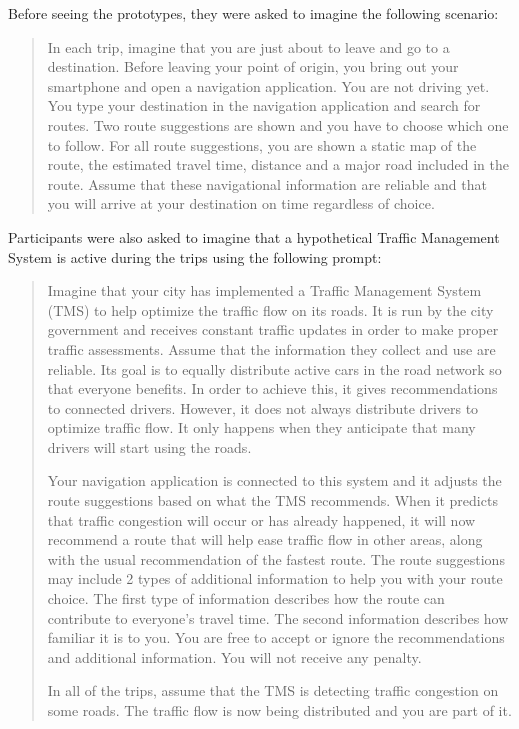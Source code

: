 Before seeing the prototypes, they were asked to imagine the following scenario:
\begin{quote}
    In each trip, imagine that you are just about to leave and go to a destination. Before leaving your point of origin, you bring out your smartphone and open a navigation application. You are not driving yet. You type your destination in the navigation application and search for routes. Two route suggestions are shown and you have to choose which one to follow. For all route suggestions, you are shown a static map of the route, the estimated travel time, distance and a major road included in the route. Assume that these navigational information are reliable and that you will arrive at your destination on time regardless of choice. 
\end{quote}

Participants were also asked to imagine that a hypothetical Traffic Management System is active during the trips using the following prompt:
\begin{quote}
    Imagine that your city has implemented a Traffic Management System (TMS) to help optimize the traffic flow on its roads. It is run by the city government and receives constant traffic updates in order to make proper traffic assessments. Assume that the information they collect and use are reliable. Its goal is to equally distribute active cars in the road network so that everyone benefits. In order to achieve this, it gives recommendations to connected drivers. However, it does not always distribute drivers to optimize traffic flow. It only happens when they anticipate that many drivers will start using the roads. 

    Your navigation application is connected to this system and it adjusts the route suggestions based on what the TMS recommends. When it predicts that traffic congestion will occur or has already happened, it will now recommend a route that will help ease traffic flow in other areas, along with the usual recommendation of the fastest route. The route suggestions may include 2 types of additional information to help you with your route choice. The first type of information describes how the route can contribute to everyone's travel time. The second information describes how familiar it is to you. You are free to accept or ignore the recommendations and additional information. You will not receive any penalty. 

    In all of the trips, assume that the TMS is detecting traffic congestion on some roads. The traffic flow is now being distributed and you are part of it.
\end{quote}

